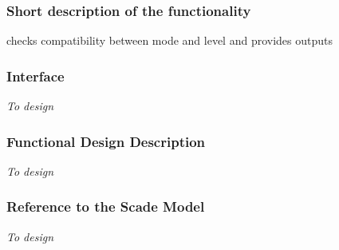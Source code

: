 \subsubsection{Short description of the functionality}
checks compatibility between mode and level and provides outputs

\subsubsection{Interface}
\emph{To design}

\subsubsection{Functional Design Description}
\emph{To design}

\subsubsection{Reference to the Scade Model}
\emph{To design}
